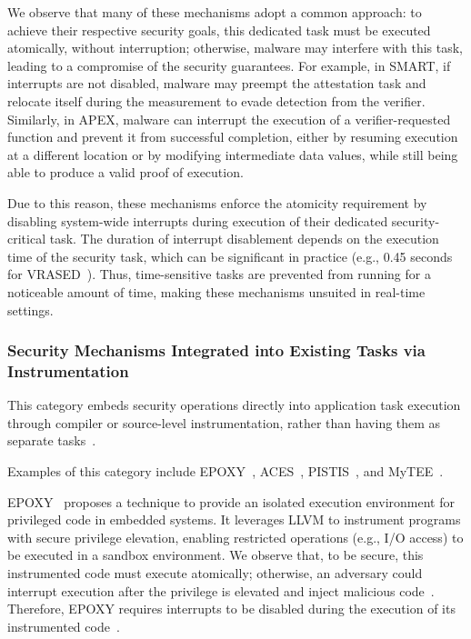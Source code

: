 \documentclass[a4paper,10pt]{article}
\begin{document}
We observe that many of these mechanisms adopt a common approach: to achieve their respective security goals, this dedicated task must be executed atomically, without interruption; otherwise, malware may interfere with this task, leading to a compromise of the security guarantees.
For example, in SMART, if interrupts are not disabled, malware may preempt the attestation task and relocate itself during the measurement to evade detection from the verifier.
Similarly, in APEX, malware can interrupt the execution of a verifier-requested function and prevent it from successful completion, either by resuming execution at a different location or by modifying intermediate data values, while still being able to produce a valid proof of execution.

Due to this reason, these mechanisms enforce the atomicity requirement by disabling system-wide interrupts during execution of their dedicated security-critical task. 
The duration of interrupt disablement depends on the execution time of the security task, which can be significant in practice (e.g., 0.45 seconds for VRASED~\cite{nunes2019vrased}). 
Thus, time-sensitive tasks are prevented from running for a noticeable amount of time, making these mechanisms unsuited in real-time settings.




\subsubsection{Security Mechanisms Integrated into Existing Tasks via Instrumentation}
This category embeds security operations directly into application task execution through compiler or source-level instrumentation, rather than having them as separate tasks~\cite{li2017epoxy,nunes2019aces,nunes2021pistis,wang2022mytee}. 

Examples of this category include EPOXY~\cite{li2017epoxy}, ACES~\cite{nunes2019aces}, PISTIS~\cite{nunes2021pistis}, and MyTEE~\cite{wang2022mytee}. 

EPOXY~\cite{li2017epoxy} proposes a technique to provide an isolated execution environment for privileged code in embedded systems.
It leverages LLVM to instrument programs with secure privilege elevation, enabling restricted operations (e.g., I/O access) to be executed in a sandbox environment.
We observe that, to be secure, this instrumented code must execute atomically; otherwise, an adversary could interrupt execution after the privilege is elevated and inject malicious code~\cite{li2017epoxy}.
Therefore, EPOXY requires interrupts to be disabled during the execution of its instrumented code~\cite{li2017epoxy}.
\end{document}
